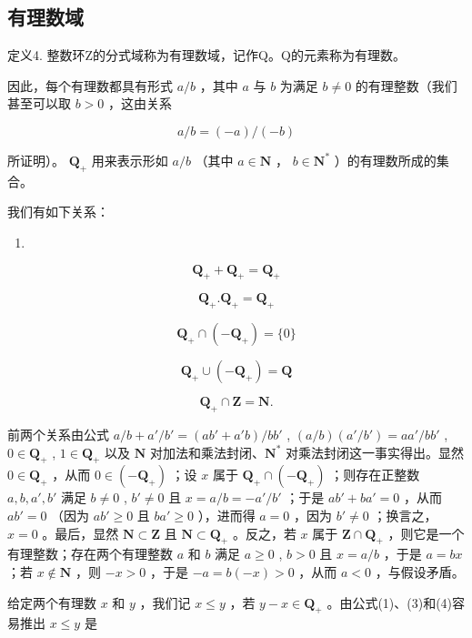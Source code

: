 \subsection{有理数域}

定义4. 整数环Z的分式域称为有理数域，记作Q。Q的元素称为有理数。

因此，每个有理数都具有形式 \(a / b\) ，其中 \(a\) 与 \(b\) 为满足 \(b \neq 0\) 的有理整数（我们甚至可以取 \(b > 0\) ，这由关系

\[
a / b = (- a) / (- b)
\]

所证明）。 \(\mathbf{Q}_{+}\) 用来表示形如 \(a / b\) （其中 \(a\in \mathbf{N}\) ， \(b\in \mathbf{N}^*\) ）的有理数所成的集合。

我们有如下关系：

\begin{enumerate}
\def\labelenumi{(\arabic{enumi})}
\tightlist
\item
\end{enumerate}

\[
\mathbf {Q} _ {+} + \mathbf {Q} _ {+} = \mathbf {Q} _ {+}\tag{2}
\]

\[
\mathbf {Q} _ {+}. \mathbf {Q} _ {+} = \mathbf {Q} _ {+}\tag{3}
\]

\[
\mathbf {Q} _ {+} \cap (- \mathbf {Q} _ {+}) = \{0 \}\tag{4}
\]

\[
\mathbf {Q} _ {+} \cup (- \mathbf {Q} _ {+}) = \mathbf {Q}\tag{5}
\]

\[
\mathbf {Q} _ {+} \cap \mathbf {Z} = \mathbf {N}.
\]

前两个关系由公式 \(a / b + a' / b' = (ab' + a'b) / bb'\) , \((a / b)(a'/b') = aa'/bb'\) , \(0 \in \mathbf{Q}_+\) , \(1 \in \mathbf{Q}_+\) 以及 \(\mathbf{N}\) 对加法和乘法封闭、\(\mathbf{N}^*\) 对乘法封闭这一事实得出。显然 \(0 \in \mathbf{Q}_+\) ，从而 \(0 \in (-\mathbf{Q}_+)\) ；设 \(x\) 属于 \(\mathbf{Q}_+ \cap (-\mathbf{Q}_+)\) ；则存在正整数 \(a, b, a', b'\) 满足 \(b \neq 0\) , \(b' \neq 0\) 且 \(x = a / b = -a'/b'\) ；于是 \(ab' + ba' = 0\) ，从而 \(ab' = 0\) （因为 \(ab' \geqslant 0\) 且 \(ba' \geqslant 0\) ），进而得 \(a = 0\) ，因为 \(b' \neq 0\) ；换言之， \(x = 0\) 。最后，显然 \(\mathbf{N} \subset \mathbf{Z}\) 且 \(\mathbf{N} \subset \mathbf{Q}_+\) 。反之，若 \(x\) 属于 \(\mathbf{Z} \cap \mathbf{Q}_+\) ，则它是一个有理整数；存在两个有理整数 \(a\) 和 \(b\) 满足 \(a \geqslant 0\) , \(b > 0\) 且 \(x = a / b\) ，于是 \(a = bx\) ；若 \(x \notin \mathbf{N}\) ，则 \(-x > 0\) ，于是 \(-a = b(-x) > 0\) ，从而 \(a < 0\) ，与假设矛盾。

给定两个有理数 \(x\) 和 \(y\) ，我们记 \(x \leqslant y\) ，若 \(y - x \in \mathbf{Q}_+\) 。由公式(1)、(3)和(4)容易推出 \(x \leqslant y\) 是

